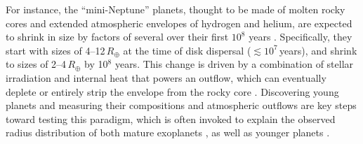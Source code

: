\documentclass[12pt,modern,tighten]{aastex63}
\begin{document}
For instance, the ``mini-Neptune'' planets, thought to be made of
molten rocky cores and extended atmospheric envelopes of hydrogen and
helium, are expected to shrink in size by factors of several over
their first $10^8$ years
\citep{owen_constraining_2020,kite_atmosphere_2020}.  Specifically,
they start with sizes of 4--12\,$R_\oplus$ at the time of disk
dispersal ($\lesssim$$10^7$\,years), and shrink to sizes of
2--4\,$R_\oplus$ by 10$^8$ years.  This change is driven by a
combination of stellar irradiation and internal heat that powers an
outflow, which can eventually deplete or entirely strip the envelope
from the rocky core \citep{Owen_Wu_2013,gupta_sculpting_2019}.
Discovering young planets and measuring their compositions and
atmospheric outflows are key steps toward testing this paradigm, which
is often invoked to explain the observed radius distribution of both
mature exoplanets \citep{Fulton_et_al_2017}, as well as younger
planets \citep{bouma_cluster_2020}.


\end{document}

